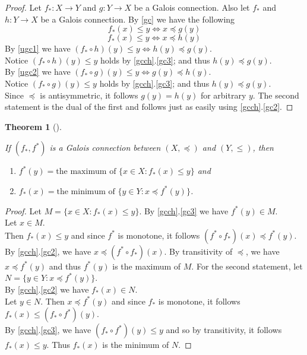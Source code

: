 \documentclass[
  letterpaper,
  10pt,
  reqno,
  twopage,
  openany]{book}
\providecommand{\tightlist}{%
  \setlength{\itemsep}{0pt}\setlength{\parskip}{0pt}}\usepackage{longtable,booktabs,array}
\theoremstyle{plain}
\theoremstyle{definition}
\theoremstyle{definition}
\theoremstyle{definition}
\theoremstyle{plain}
\theoremstyle{plain}
\newtheorem{theorem}{Theorem}[chapter]
\theoremstyle{remark}
\begin{document}
\begin{proof}

Let \(f_*:X \to Y\) and \(g:Y\to X\) be a Galois connection. Also let
\(f_*\) and \(h:Y\to X\) be a Galois connection. By \eqref{gc} we have
the following\\
\[
f_*(x) \leqslant y \Longleftrightarrow x\preceq g(y)
\] \[
f_*(x)\leqslant y  \Longleftrightarrow x\preceq h(y)
\] By \eqref{ugc1} we have
\((f_*\circ h)(y)\leqslant y \Longleftrightarrow h(y)\preceq g(y)\).\\
Notice \((f_*\circ h)(y)\leqslant y\) holds by \ref{gcch}.\eqref{gc3};
and thus \(h(y)\preceq g(y)\).\\
By \eqref{ugc2} we have
\((f_*\circ g)(y)\leqslant y \Longleftrightarrow g(y)\preceq h(y)\).\\
Notice \((f_*\circ g)(y)\leqslant y\) holds by \ref{gcch}.\eqref{gc3};
and thus \(h(y)\preceq g(y)\).\\
Since \(\preceq\) is antisymmetric, it follows \(g(y)=h(y)\) for
arbitrary \(y\). The second statement is the dual of the first and
follows just as easily using \ref{gcch}.\eqref{gc2}.

\end{proof}

\leavevmode{}%
\begin{theorem}[]\label{thm-maxmin}

If \((f_*, f^*)\) is a Galois connection between \((X,\preceq)\) and
\((Y,\leqslant)\), then

\begin{enumerate}
\def\labelenumi{\arabic{enumi}.}
\tightlist
\item
  \(f^*(y)=\textrm{the maximum of } \{x\in X : f_*(x)\leqslant y\}\) and
\item
  \(f_*(x)=\textrm{the minimum of } \{y\in Y : x\preceq f^*(y)\}\).
\end{enumerate}

\end{theorem}

\begin{proof}

Let \(M=\{x\in X: f_*(x)\leqslant y\}\). By \ref{gcch}.\eqref{gc3} we
have \(f^*(y)\in M\).\\
Let \(x\in M\).\\
Then \(f_*(x)\leqslant y\) and since \(f^*\) is monotone, it follows
\((f^*\circ f_*)(x)\preceq f^*(y)\). By \ref{gcch}.\eqref{gc2}, we have
\(x\preceq (f^*\circ f_*)(x)\). By transitivity of \(\preceq\), we have
\(x\preceq f^*(y)\) and thus \(f^*(y)\) is the maximum of \(M\). For the
second statement, let \(N=\{y\in Y : x\preceq f^*(y)\}\).\\
By \ref{gcch}.\eqref{gc2} we have \(f_*(x)\in N\).\\
Let \(y\in N\). Then \(x\preceq f^*(y)\) and since \(f_*\) is monotone,
it follows \(f_*(x)\leqslant (f_*\circ f^*)(y)\).\\
By \ref{gcch}.\eqref{gc3}, we have \((f_*\circ f^*)(y)\leqslant y\) and
so by transitivity, it follows \(f_*(x)\leqslant y\). Thus \(f_*(x)\) is
the minimum of \(N\).

\end{proof}
\end{document}
